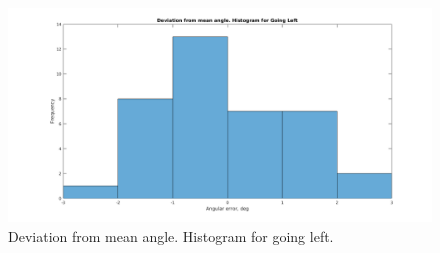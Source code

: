 \documentclass[paper=a4, fontsize=11pt]{scrartcl} %
\begin{document}
	\begin{figure}[h!]
		\begin{center}
			\setlength{\fboxsep}{0.5pt} %
			\setlength{\fboxrule}{0.5pt}
			\includegraphics[width=\linewidth,fbox]{images/histogram_4_phi_left.png}
			\caption{Deviation from mean angle. Histogram for going left.}
		\end{center}
	\end{figure}
	
	
    \newpage
\end{document}
